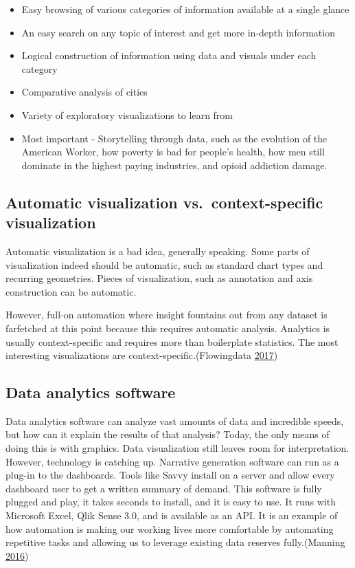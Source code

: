 \documentclass[]{book}
\providecommand{\tightlist}{%
  \setlength{\itemsep}{0pt}\setlength{\parskip}{0pt}}
\begin{document}
\begin{itemize}
\tightlist
\item
  Easy browsing of various categories of information available at a single glance
\item
  An easy search on any topic of interest and get more in-depth information
\item
  Logical construction of information using data and visuals under each category
\item
  Comparative analysis of cities
\item
  Variety of exploratory visualizations to learn from
\item
  Most important - Storytelling through data, such as the evolution of the American Worker, how poverty is bad for people's health, how men still dominate in the highest paying industries, and opioid addiction damage.
\end{itemize}

\hypertarget{automatic-visualization-vs.context-specific-visualization}{%
\subsection{Automatic visualization vs.~context-specific visualization}\label{automatic-visualization-vs.context-specific-visualization}}

Automatic visualization is a bad idea, generally speaking. Some parts of visualization indeed should be automatic, such as standard chart types and recurring geometries. Pieces of visualization, such as annotation and axis construction can be automatic.

However, full-on automation where insight fountains out from any dataset is farfetched at this point because this requires automatic analysis. Analytics is usually context-specific and requires more than boilerplate statistics. The most interesting visualizations are context-specific.(Flowingdata \protect\hyperlink{ref-auto_viz}{2017})

\hypertarget{data-analytics-software}{%
\subsection{Data analytics software}\label{data-analytics-software}}

Data analytics software can analyze vast amounts of data and incredible speeds, but how can it explain the results of that analysis? Today, the only means of doing this is with graphics. Data visualization still leaves room for interpretation. However, technology is catching up. Narrative generation software can run as a plug-in to the dashboards. Tools like Savvy install on a server and allow every dashboard user to get a written summary of demand. This software is fully plugged and play, it takes seconds to install, and it is easy to use. It runs with Microsoft Excel, Qlik Sense 3.0, and is available as an API. It is an example of how automation is making our working lives more comfortable by automating repetitive tasks and allowing us to leverage existing data reserves fully.(Manning \protect\hyperlink{ref-work_place}{2016})
\end{document}
